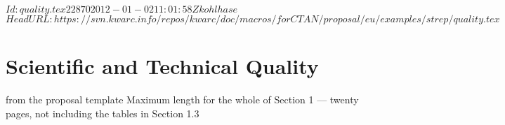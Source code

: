 \svnInfo $Id: quality.tex 22870 2012-01-02 11:01:58Z kohlhase $
\svnKeyword $HeadURL: https://svn.kwarc.info/repos/kwarc/doc/macros/forCTAN/proposal/eu/examples/strep/quality.tex $
\chapter{Scientific and Technical Quality}\label{chap:quality}
\begin{todo}{from the proposal template}
  Maximum length for the whole of Section 1 –-- twenty pages, not including the tables in
  Section 1.3
\end{todo}





